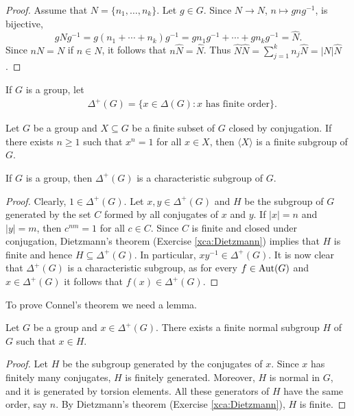 \begin{graybox}
\begin{proof}
	Assume that $N=\{n_1,\dots,n_k\}$. Let 
	$g\in G$. Since $N\to N$, $n\mapsto gng^{-1}$, is bijective, 
	\[
		g\widehat{N}g^{-1}=g(n_1+\cdots+n_k)g^{-1}=gn_1g^{-1}+\cdots+gn_kg^{-1}=\widehat{N}.
	\]
	Since $nN=N$ if $n\in N$, it follows that $n\widehat{N}=\widehat{N}$. Thus 
	$\widehat{N}\widehat{N}=\sum_{j=1}^k n_j\widehat{N}=|N|\widehat{N}$.
\end{proof}

If $G$ is a group, let 
\begin{align*}
	&\Delta^+(G)=\{x\in \Delta(G):\text{$x$ has finite order}\}.
\end{align*}

\begin{xca}
        \label{xca:Dietzmann}
        Let $G$ be a group and $X\subseteq G$ be a finite subset of $G$ closed by
        conjugation. If there exists $n\geq1$ such that $x^n=1$ for all $x\in X$, then
        $\langle X\rangle$ is a finite subgroup of $G$.
\end{xca}

\begin{proposition}
	\label{lem:DcharG}
	If $G$ is a group, then $\Delta^+(G)$ is a characteristic subgroup of $G$.
\end{proposition}

\begin{proof}
	Clearly, $1\in\Delta^+(G)$. 
	Let $x,y\in\Delta^+(G)$ and $H$ be the subgroup of $G$ generated by the set 
	$C$ formed by all conjugates of $x$ and $y$. If $|x|=n$ and 
	$|y|=m$, then $c^{nm}=1$ for all $c\in C$. 
	Since $C$ is finite and closed under conjugation, Dietzmann's theorem (Exercise \ref{xca:Dietzmann})
	implies that $H$ is finite and hence 
	$H\subseteq\Delta^+(G)$. In particular, $xy^{-1}\in\Delta^+(G)$. It is now clear
	that $\Delta^+(G)$ is a characteristic subgroup, as for 
	every $f\in\operatorname{Aut}(G)$ and $x\in\Delta^+(G)$ it follows that $f(x)\in\Delta^+(G)$. 
\end{proof}

To prove Connel's theorem we need a lemma. 

\begin{lemma}
	\label{lem:Connel}
	Let $G$ be a group and  $x\in\Delta^+(G)$. There exists a finite normal subgroup
	$H$ of $G$ such that $x\in H$.
\end{lemma}

\begin{proof}
	Let $H$ be the subgroup generated by the conjugates of $x$. Since $x$ has finitely many conjugates, 
	$H$ is finitely generated. Moreover, $H$ is normal in $G$, and it is generated by torsion elements. 
	All these generators of $H$ have the same order, say $n$. By Dietzmann's theorem (Exercise \ref{xca:Dietzmann}), 
	$H$ is finite. 
\end{proof}


\end{graybox}
